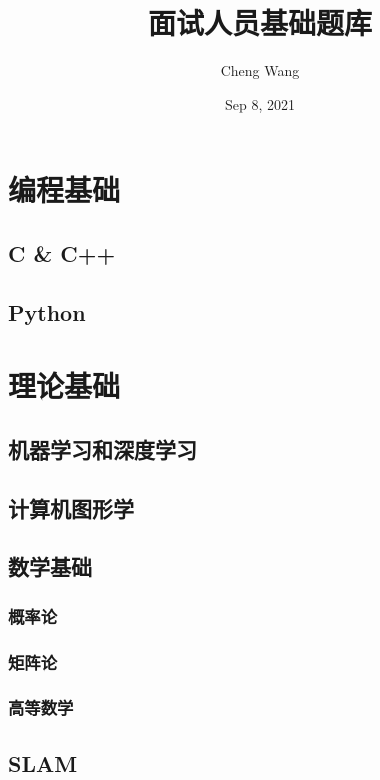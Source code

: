 \documentclass[cn,10pt,math=newtx,citestyle=gb7714-2015,bibstyle=gb7714-2015]{elegantbook}
\title{面试人员基础题库}
\author{Cheng Wang}
\date{Sep 8, 2021}
\begin{document}
\maketitle
\frontmatter

\tableofcontents

\mainmatter

\chapter{编程基础}

\section{C \& C++}

\section{Python}

\chapter{理论基础}

\section{机器学习和深度学习}

\section{计算机图形学}

\section{数学基础}

\subsection{概率论}

\subsection{矩阵论}

\subsection{高等数学}

\section{SLAM}
\end{document}
